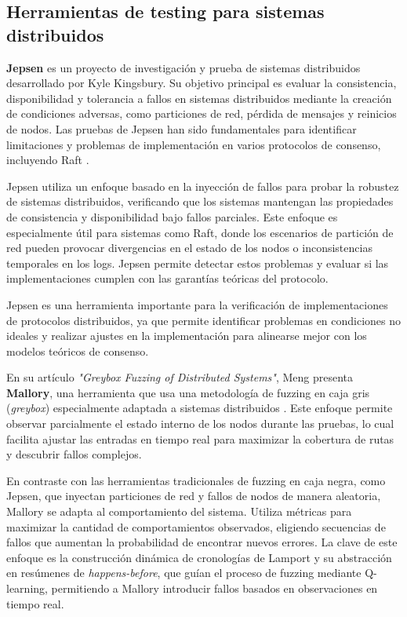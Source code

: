 \documentclass[12pt]{article}
\begin{document}
\subsection{Herramientas de testing para sistemas distribuidos}

\textbf{Jepsen} es un proyecto de investigación y prueba de sistemas distribuidos desarrollado por Kyle Kingsbury. Su objetivo principal es evaluar la consistencia, disponibilidad y tolerancia a fallos en sistemas distribuidos mediante la creación de condiciones adversas, como particiones de red, pérdida de mensajes y reinicios de nodos. Las pruebas de Jepsen han sido fundamentales para identificar limitaciones y problemas de implementación en varios protocolos de consenso, incluyendo Raft \cite{jepsen2020}.

Jepsen utiliza un enfoque basado en la inyección de fallos para probar la robustez de sistemas distribuidos, verificando que los sistemas mantengan las propiedades de consistencia y disponibilidad bajo fallos parciales. Este enfoque es especialmente útil para sistemas como Raft, donde los escenarios de partición de red pueden provocar divergencias en el estado de los nodos o inconsistencias temporales en los logs. Jepsen permite detectar estos problemas y evaluar si las implementaciones cumplen con las garantías teóricas del protocolo.

Jepsen es una herramienta importante para la verificación de implementaciones de protocolos distribuidos, ya que permite identificar problemas en condiciones no ideales y realizar ajustes en la implementación para alinearse mejor con los modelos teóricos de consenso.

En su artículo \textit{"Greybox Fuzzing of Distributed Systems"}, Meng presenta \textbf{Mallory}, una herramienta que usa una metodología de fuzzing en caja gris (\textit{greybox}) especialmente adaptada a sistemas distribuidos \cite{meng2023}. Este enfoque permite observar parcialmente el estado interno de los nodos durante las pruebas, lo cual facilita ajustar las entradas en tiempo real para maximizar la cobertura de rutas y descubrir fallos complejos.

En contraste con las herramientas tradicionales de fuzzing en caja negra, como Jepsen, que inyectan particiones de red y fallos de nodos de manera aleatoria, Mallory se adapta al comportamiento del sistema. Utiliza métricas para maximizar la cantidad de comportamientos observados, eligiendo secuencias de fallos que aumentan la probabilidad de encontrar nuevos errores. La clave de este enfoque es la construcción dinámica de cronologías de Lamport y su abstracción en resúmenes de \textit{happens-before}, que guían el proceso de fuzzing mediante Q-learning, permitiendo a Mallory introducir fallos basados en observaciones en tiempo real.
\end{document}

